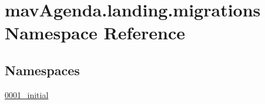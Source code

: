 \hypertarget{namespacemavAgenda_1_1landing_1_1migrations}{}\section{mav\+Agenda.\+landing.\+migrations Namespace Reference}
\label{namespacemavAgenda_1_1landing_1_1migrations}
\subsection*{Namespaces}
\begin{DoxyCompactItemize}
\item 
 \mbox{\hyperlink{namespacemavAgenda_1_1landing_1_1migrations_1_10001__initial}{0001\+\_\+initial}}
\end{DoxyCompactItemize}
